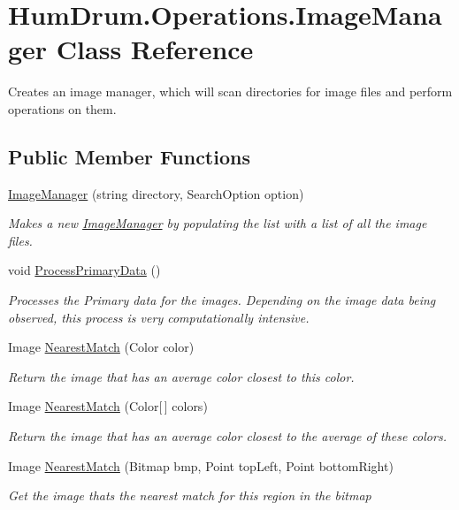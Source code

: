 \hypertarget{classHumDrum_1_1Operations_1_1ImageManager}{}\section{Hum\+Drum.\+Operations.\+Image\+Manager Class Reference}
\label{classHumDrum_1_1Operations_1_1ImageManager}


Creates an image manager, which will scan directories for image files and perform operations on them.  


\subsection*{Public Member Functions}
\begin{DoxyCompactItemize}
\item 
\hyperlink{classHumDrum_1_1Operations_1_1ImageManager_ad27339d50299fa4a445d505ececde75c}{Image\+Manager} (string directory, Search\+Option option)
\begin{DoxyCompactList}\small\item\em Makes a new \hyperlink{classHumDrum_1_1Operations_1_1ImageManager}{Image\+Manager} by populating the list with a list of all the image files. \end{DoxyCompactList}\item 
void \hyperlink{classHumDrum_1_1Operations_1_1ImageManager_a947dc7ce88cf1b48c1418ecad86aaaf3}{Process\+Primary\+Data} ()
\begin{DoxyCompactList}\small\item\em Processes the Primary data for the images. Depending on the image data being observed, this process is very computationally intensive. \end{DoxyCompactList}\item 
Image \hyperlink{classHumDrum_1_1Operations_1_1ImageManager_aa5a55944017ccdad1031aa18e211e8fe}{Nearest\+Match} (Color color)
\begin{DoxyCompactList}\small\item\em Return the image that has an average color closest to this color. \end{DoxyCompactList}\item 
Image \hyperlink{classHumDrum_1_1Operations_1_1ImageManager_a5cdf2e70860d0e2e38d5897124b451c1}{Nearest\+Match} (Color\mbox{[}$\,$\mbox{]} colors)
\begin{DoxyCompactList}\small\item\em Return the image that has an average color closest to the average of these colors. \end{DoxyCompactList}\item 
Image \hyperlink{classHumDrum_1_1Operations_1_1ImageManager_afb3f985050aa6f09c876bf30ec57e920}{Nearest\+Match} (Bitmap bmp, Point top\+Left, Point bottom\+Right)
\begin{DoxyCompactList}\small\item\em Get the image that\textquotesingle{}s the nearest match for this region in the bitmap \end{DoxyCompactList}\end{DoxyCompactItemize}
